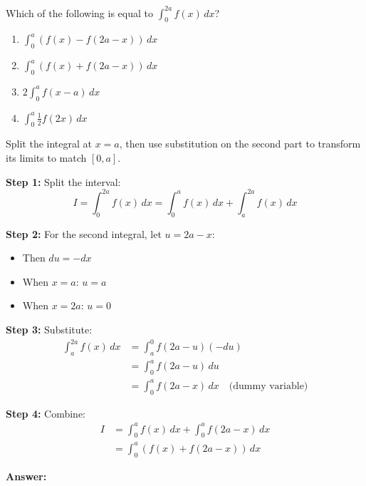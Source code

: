 \vspace{1.5cm}


\begin{problem}
Which of the following is equal to $\displaystyle \int_0^{2a} f(x) \, dx$?

\begin{enumerate}
\item[(A)] $\displaystyle \int_0^a \left( f(x) - f(2a - x) \right) \, dx$
\item[(B)] $\displaystyle \int_0^a \left( f(x) + f(2a - x) \right) \, dx$
\item[(C)] $\displaystyle 2 \int_0^a f(x - a) \, dx$
\item[(D)] $\displaystyle \int_0^a \frac{1}{2} f(2x) \, dx$
\end{enumerate}
\end{problem}

\begin{hint}
Split the integral at $x=a$, then use substitution on the second part to transform its limits to match $[0,a]$.
\end{hint}

\begin{solution}
\textbf{Step 1:} Split the interval:
\[
I = \int_0^{2a} f(x) \, dx = \int_0^a f(x) \, dx + \int_a^{2a} f(x) \, dx
\]

\textbf{Step 2:} For the second integral, let $u = 2a - x$:
\begin{itemize}
\item Then $du = -dx$
\item When $x = a$: $u = a$
\item When $x = 2a$: $u = 0$
\end{itemize}

\textbf{Step 3:} Substitute:
\begin{align*}
    \int_a^{2a} f(x) \, dx &= \int_a^0 f(2a - u) (-du) \\
    &= \int_0^a f(2a - u) \, du \\
    &= \int_0^a f(2a - x) \, dx \quad \text{(dummy variable)}
\end{align*}

\textbf{Step 4:} Combine:
\begin{align*}
    I &= \int_0^a f(x) \, dx + \int_0^a f(2a - x) \, dx \\
    &= \int_0^a \left( f(x) + f(2a - x) \right) \, dx
\end{align*}

\textbf{Answer:} 
\end{solution}

